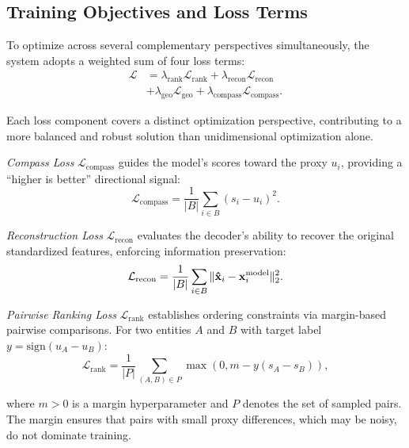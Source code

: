 \documentclass[english]{sbrt}
\begin{document}
\subsection{Training Objectives and Loss Terms}

To optimize across several complementary perspectives simultaneously, the system adopts a weighted sum of four loss terms:
\begin{equation}
\begin{aligned}
    \mathcal{L} &=
    \lambda_\mathrm{rank} \mathcal{L}_\mathrm{rank} +
    \lambda_\mathrm{recon} \mathcal{L}_\mathrm{recon} \\
    &+
    \lambda_\mathrm{geo} \mathcal{L}_\mathrm{geo} +
    \lambda_\mathrm{compass} \mathcal{L}_\mathrm{compass}.
\end{aligned}
\end{equation}

Each loss component covers a distinct optimization perspective, contributing to a more balanced and robust solution than unidimensional optimization alone.

\textit{Compass Loss} $\mathcal{L}_\mathrm{compass}$ guides the model's scores toward the proxy $u_i$, providing a ``higher is better'' directional signal:
\begin{equation}
    \mathcal{L}_{\mathrm{compass}} = \frac{1}{|B|} \sum_{i \in B} (s_i - u_i)^2.
\end{equation}

\textit{Reconstruction Loss} $\mathcal{L}_\mathrm{recon}$ evaluates the decoder's ability to recover the original standardized features, enforcing information preservation:
\begin{equation}
    \mathcal{L}_{\mathrm{recon}} = \frac{1}{|B|} \sum_{i \in B} \|\mathbf{\hat{x}}_i - \mathbf{x}^\mathrm{model}_i\|_2^2.
\end{equation}

\textit{Pairwise Ranking Loss} $\mathcal{L}_\mathrm{rank}$ establishes ordering constraints via margin-based pairwise comparisons. For two entities $A$ and $B$ with target label $y = \mathrm{sign}(u_A - u_B)$:
\begin{equation}
    \mathcal{L}_{\mathrm{rank}} = \frac{1}{|P|} \sum_{(A,B) \in P} \max(0, m - y(s_A - s_B)),
\end{equation}

\noindent
where $m > 0$ is a margin hyperparameter and $P$ denotes the set of sampled pairs. The margin ensures that pairs with small proxy differences, which may be noisy, do not dominate training.
\end{document}
